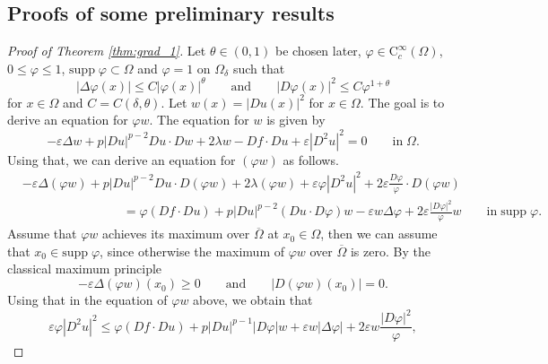 \documentclass[11pt,reqno]{amsart}
\numberwithin{figure}{section}
\theoremstyle{plain}
\theoremstyle{remark}
\numberwithin{equation}{section}
\begin{document}
\begin{appendices}
\section{Proofs of some preliminary results}
\begin{proof}[Proof of Theorem \ref{thm:grad_1}] Let $\theta\in (0,1)$ be chosen later, $\varphi\in \mathrm{C}_c^\infty(\Omega)$, $0\leq \varphi\leq 1$, $\mathrm{supp}\;\varphi\subset \Omega$ and $\varphi = 1$ on $\Omega_\delta$ such that
\begin{equation}\label{e:ass_power}
    |\Delta \varphi(x)| \leq C|\varphi(x)|^\theta \qquad\text{and}\qquad |D \varphi(x)|^2 \leq C\varphi^{1+\theta}
\end{equation}
for $x\in \Omega$ and $C = C(\delta,\theta)$.
Let $w(x) = |Du(x)|^2$ for $x\in \Omega$. The goal is to derive an equation for $\varphi w$. The equation for $w$ is given by
\begin{equation*}
    -\varepsilon \Delta w + p|D u|^{p-2}D u \cdot D w + 2\lambda w - D f\cdot D u + \varepsilon |D^2u|^2 = 0 \qquad\text{in}\;\Omega.
\end{equation*}
Using that, we can derive an equation for $(\varphi w)$ as follows.
\begin{align*}
    &-\varepsilon \Delta (\varphi w) + p|D u|^{p-2}D u \cdot D (\varphi w) + 2\lambda (\varphi w) + \varepsilon \varphi|D^2u|^2 + 2\varepsilon \frac{D \varphi}{\varphi}\cdot D (\varphi w) \\
    &\qquad\qquad\qquad\qquad = \varphi(D f\cdot D u) + p|D u|^{p-2}(D u\cdot D \varphi)w -\varepsilon w \Delta \varphi + 2\varepsilon \frac{|D \varphi|^2}{\varphi}w
    \qquad\text{in}\;\mathrm{supp}\;\varphi.
\end{align*}
Assume that $\varphi w$ achieves its maximum over $\overline{\Omega}$ at $x_0\in \Omega$, then we can assume that $x_0\in \mathrm{supp}\;\varphi$, since otherwise the maximum of $\varphi w$ over $\overline{\Omega}$ is zero. By the classical maximum principle 
\begin{equation*}
    -\varepsilon \Delta(\varphi w)(x_0)\geq 0 \qquad\text{and}\qquad |D(\varphi w)(x_0)| = 0.
\end{equation*}
Using that in the equation of $\varphi w$ above, we obtain that
\begin{equation*}
    \varepsilon \varphi|D^2u|^2 \leq  \varphi (Df\cdot Du)+ p|Du|^{p-1} |D\varphi|w + \varepsilon w |\Delta\varphi|  + 2\varepsilon  w\frac{|D\varphi|^2}{\varphi},
\end{equation*}

\end{proof}
\end{appendices}
\end{document}
